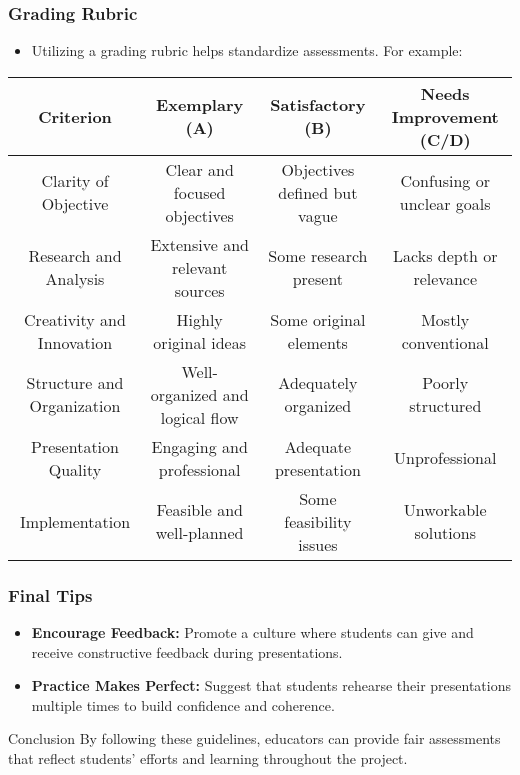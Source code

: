 \documentclass[aspectratio=169]{beamer}
\begin{document}
\begin{frame}[fragile]
    \frametitle{Grading Rubric}
    \begin{itemize}
        \item Utilizing a grading rubric helps standardize assessments. For example:
    \end{itemize}

    \begin{center}
        \begin{tabular}{|c|c|c|c|}
            \hline
            Criterion & Exemplary (A) & Satisfactory (B) & Needs Improvement (C/D) \\
            \hline
            Clarity of Objective & Clear and focused objectives & Objectives defined but vague & Confusing or unclear goals \\
            \hline
            Research and Analysis & Extensive and relevant sources & Some research present & Lacks depth or relevance \\
            \hline
            Creativity and Innovation & Highly original ideas & Some original elements & Mostly conventional \\
            \hline
            Structure and Organization & Well-organized and logical flow & Adequately organized & Poorly structured \\
            \hline
            Presentation Quality & Engaging and professional & Adequate presentation & Unprofessional \\
            \hline
            Implementation & Feasible and well-planned & Some feasibility issues & Unworkable solutions \\
            \hline
        \end{tabular}
    \end{center}
\end{frame}

\begin{frame}[fragile]
    \frametitle{Final Tips}
    \begin{itemize}
        \item \textbf{Encourage Feedback:} Promote a culture where students can give and receive constructive feedback during presentations.
        \item \textbf{Practice Makes Perfect:} Suggest that students rehearse their presentations multiple times to build confidence and coherence.
    \end{itemize}
    
    \begin{block}{Conclusion}
        By following these guidelines, educators can provide fair assessments that reflect students’ efforts and learning throughout the project.
    \end{block}
\end{frame}
\end{document}
